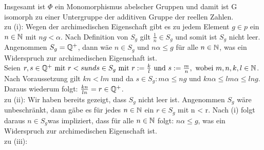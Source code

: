 {\begin{enumerate}
\end{enumerate}
Insgesamt ist $\Phi$ ein Monomorphismus abelscher Gruppen und damit ist G isomorph zu einer Untergruppe der additiven Gruppe der reellen Zahlen.\\ 
zu (i): Wegen der archimedischen Eigenschaft gibt es zu jedem Element $g \in p$ ein $n \in \mathbb{N}$ mit $ng < \alpha$. Nach Definition von $S_g$ gilt $\frac{1}{n} \in S_g$ und somit ist $S_g$ nicht leer.\\ Angenommen $S_g = \mathbb{Q}^{+}$, dann wäe $n \in S_g$ und $n\alpha \le g$ für alle $n\in\mathbb{N}$, was ein Widerspruch zur archimedischen Eigenschaft ist.\\
Seien $r, s \in \mathbb{Q}^{+} \text{ mit } r < s und s \in S_g \text { mit } r := \frac{k}{l} \text{ und } s:= \frac{m}{n}, \text{ wobei } m, n ,k, l \in \mathbb{N}$. Nach Voraussetzung gilt $kn < lm $ und da $s \in S_g: m\alpha \le ng$ und $kn\alpha \le lm\alpha \le lng.$ Daraus wiederum folgt: $\frac{kn}{ln} = r \in \mathbb{Q}^{+}$.\\
zu (ii): Wir haben bereits gezeigt, dass $S_g$ nicht leer ist. Angenommen $S_g$ wäre unbeschränkt, dann gäbe es für jedes $n \in \mathbb{N}$ ein $r \in S_g$ mit n < r. Nach (i) folgt daraus $n \in S_g$was impliziert, dass für alle $n \in \mathbb{N}$ folgt: $ n\alpha \le g$, was ein Widerspruch zur archimedischen Eigenschaft ist.\\
zu (iii): 
}







%
%
